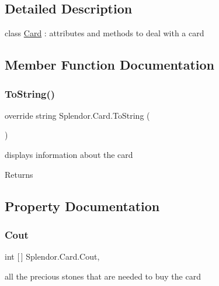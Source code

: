 \subsection{Detailed Description}
class \mbox{\hyperlink{class_splendor_1_1_card}{Card}} \+: attributes and methods to deal with a card 



\subsection{Member Function Documentation}
\mbox{\label{class_splendor_1_1_card_a3403c28ee02b119ee5aae5bd10eee468}} 
\subsubsection{\texorpdfstring{To\+String()}{ToString()}}
{\footnotesize\ttfamily override string Splendor.\+Card.\+To\+String (\begin{DoxyParamCaption}{ }\end{DoxyParamCaption})}



displays information about the card 

\begin{DoxyReturn}{Returns}

\end{DoxyReturn}


\subsection{Property Documentation}
\mbox{\label{class_splendor_1_1_card_af3c65d4d543f453d5c481682233745c7}} 
\subsubsection{\texorpdfstring{Cout}{Cout}}
{\footnotesize\ttfamily int \mbox{[}$\,$\mbox{]} Splendor.\+Card.\+Cout\hspace{0.3cm}{\ttfamily [get]}, {\ttfamily [set]}}



all the precious stones that are needed to buy the card 

